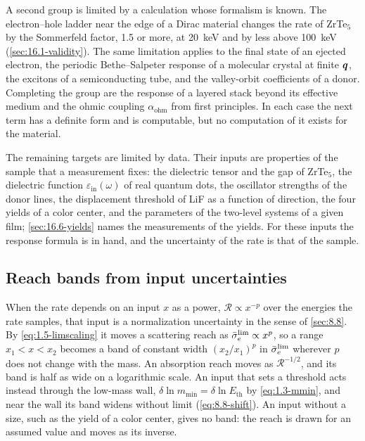 A second group is limited by a calculation whose formalism is known. The electron--hole ladder near the edge of a Dirac material changes the rate of ZrTe$_5$ by the Sommerfeld factor, 1.5 or more, at \SI{20}{keV} and by less above \SI{100}{keV} (\cref{sec:16.1-validity}). The same limitation applies to the final state of an ejected electron, the periodic Bethe--Salpeter response of a molecular crystal at finite $\bm{q}$, the excitons of a semiconducting tube, and the valley-orbit coefficients of a donor. Completing the group are the response of a layered stack beyond its effective medium and the ohmic coupling $\alpha_{\mathrm{ohm}}$ from first principles. In each case the next term has a definite form and is computable, but no computation of it exists for the material.

The remaining targets are limited by data. Their inputs are properties of the sample that a measurement fixes: the dielectric tensor and the gap of ZrTe$_5$, the dielectric function $\varepsilon_{\mathrm{in}}(\omega)$ of real quantum dots, the oscillator strengths of the donor lines, the displacement threshold of LiF as a function of direction, the four yields of a color center, and the parameters of the two-level systems of a given film; \cref{sec:16.6-yields} names the measurements of the yields. For these inputs the response formula is in hand, and the uncertainty of the rate is that of the sample.

\subsection{Reach bands from input uncertainties}\label{sec:16.9-band}

When the rate depends on an input $x$ as a power, $\mathcal{R} \propto x^{-p}$ over the energies the rate samples, that input is a normalization uncertainty in the sense of \cref{sec:8.8}. By \cref{eq:1.5-limscaling} it moves a scattering reach as $\bar{\sigma}_{e}^{\mathrm{lim}} \propto x^{p}$, so a range $x_1 < x < x_2$ becomes a band of constant width $(x_2/x_1)^p$ in $\bar{\sigma}_{e}^{\mathrm{lim}}$ wherever $p$ does not change with the mass. An absorption reach moves as $\mathcal{R}^{-1/2}$, and its band is half as wide on a logarithmic scale. An input that sets a threshold acts instead through the low-mass wall, $\delta\ln m_{\mathrm{min}} = \delta\ln E_{\mathrm{th}}$ by \cref{eq:1.3-mmin}, and near the wall its band widens without limit (\cref{eq:8.8-shift}). An input without a size, such as the yield of a color center, gives no band: the reach is drawn for an assumed value and moves as its inverse.


